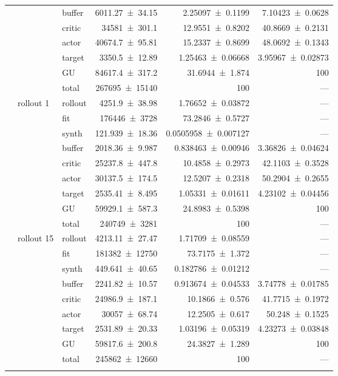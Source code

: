 {\begin{longtable}{@{}lllrrr@{}}
     &  & buffer & \num{6011.27+-34.15} & \num{2.25097+-0.1199} & \num{7.10423+-0.0628} \\
     &  & critic & \num{34581+-301.1} & \num{12.9551+-0.8202} & \num{40.8669+-0.2131} \\
     &  & actor & \num{40674.7+-95.81} & \num{15.2337+-0.8699} & \num{48.0692+-0.1343} \\
     &  & target & \num{3350.5+-12.89} & \num{1.25463+-0.06668} & \num{3.95967+-0.02873} \\
     &  & GU & \num{84617.4+-317.2} & \num{31.6944+-1.874} & 100 \\
     &  & total & \num{267695+-15140} & \num{100} & --- \\
    \addlinespace[2pt]
     & rollout 1 & rollout & \num{4251.9+-38.98} & \num{1.76652+-0.03872} & --- \\
     &  & fit & \num{176446+-3728} & \num{73.2846+-0.5727} & --- \\
     &  & synth & \num{121.939+-18.36} & \num{0.0505958+-0.007127} & --- \\
     &  & buffer & \num{2018.36+-9.987} & \num{0.838463+-0.00946} & \num{3.36826+-0.04624} \\
     &  & critic & \num{25237.8+-447.8} & \num{10.4858+-0.2973} & \num{42.1103+-0.3528} \\
     &  & actor & \num{30137.5+-174.5} & \num{12.5207+-0.2318} & \num{50.2904+-0.2655} \\
     &  & target & \num{2535.41+-8.495} & \num{1.05331+-0.01611} & \num{4.23102+-0.04456} \\
     &  & GU & \num{59929.1+-587.3} & \num{24.8983+-0.5398} & 100 \\
     &  & total & \num{240749+-3281} & \num{100} & --- \\
    \addlinespace[2pt]
     & rollout 15 & rollout & \num{4213.11+-27.47} & \num{1.71709+-0.08559} & --- \\
     &  & fit & \num{181382+-12750} & \num{73.7175+-1.372} & --- \\
     &  & synth & \num{449.641+-40.65} & \num{0.182786+-0.01212} & --- \\
     &  & buffer & \num{2241.82+-10.57} & \num{0.913674+-0.04533} & \num{3.74778+-0.01785} \\
     &  & critic & \num{24986.9+-187.1} & \num{10.1866+-0.576} & \num{41.7715+-0.1972} \\
     &  & actor & \num{30057+-68.74} & \num{12.2505+-0.617} & \num{50.248+-0.1525} \\
     &  & target & \num{2531.89+-20.33} & \num{1.03196+-0.05319} & \num{4.23273+-0.03848} \\
     &  & GU & \num{59817.6+-200.8} & \num{24.3827+-1.289} & 100 \\
     &  & total & \num{245862+-12660} & \num{100} & --- \\
    \addlinespace[2pt]
  \end{longtable}
}
